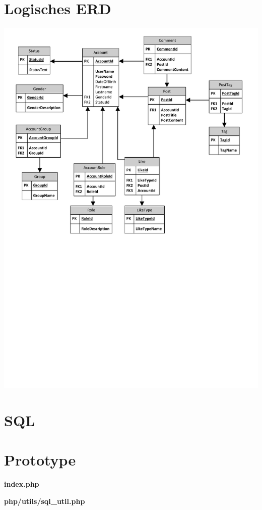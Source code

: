 \documentclass[12pt,twoside,a4paper]{article}
\begin{document}
	\section{Logisches ERD}
	\includegraphics[width=15cm]{erm}
	
	\section{SQL}
	
	
	
	
	\section{Prototype}
	
	\textbf{index.php}
	
	
	
	\textbf{php/utils/sql\_util.php}
	
	
	
\end{document}
